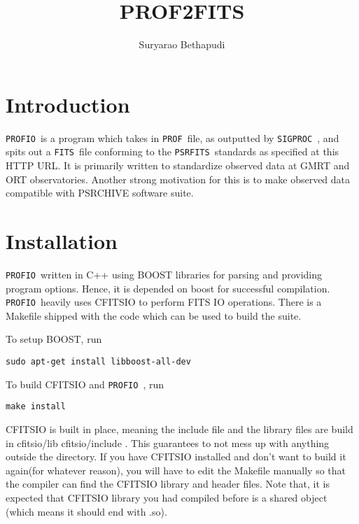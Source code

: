 \documentclass{article}
\newcommand{\prf}{\texttt{PROFIO}\ }
\newcommand{\prof}{\texttt{PROF}\ }
\newcommand{\sigproc}{\texttt{SIGPROC}\ }
\newcommand{\fits}{\texttt{FITS}\ }
\newcommand{\psrfits}{\texttt{PSRFITS}\ }
\begin{document}


\title{PROF2FITS}
\date{}
\author{Suryarao Bethapudi}
\maketitle
\section*{\hfill Introduction}

\par \prf is a program which takes in \prof file, as outputted by \sigproc, and spits out a \fits file conforming to the \psrfits standards as specified at this HTTP URL. It is primarily written to standardize observed data at GMRT and ORT observatories. Another strong motivation for this is to make observed data compatible with PSRCHIVE software suite. 

\section*{\hfill Installation}

\par \prf written in C++ using BOOST libraries for parsing and providing program options. Hence, it is depended on boost for successful compilation. \prf heavily uses CFITSIO to perform FITS IO operations. There is a Makefile shipped with the code which can be used to build the suite. 

\par To setup BOOST, run 
\begin{lstlisting}
sudo apt-get install libboost-all-dev
\end{lstlisting}
\par To build CFITSIO and \prf, run 
\begin{lstlisting}
make install 
\end{lstlisting}
\par CFITSIO is built in place, meaning the include file and the library files are build in cfitsio/lib cfitsio/include . This guarantees to not mess up with anything outside the directory. If you have CFITSIO installed and don't want to build it again(for whatever reason), you will have to edit the Makefile manually so that the compiler can find the CFITSIO library and header files. Note that, it is expected that CFITSIO library you had compiled before is a shared object (which means it should end with .so). 
\end{document}
